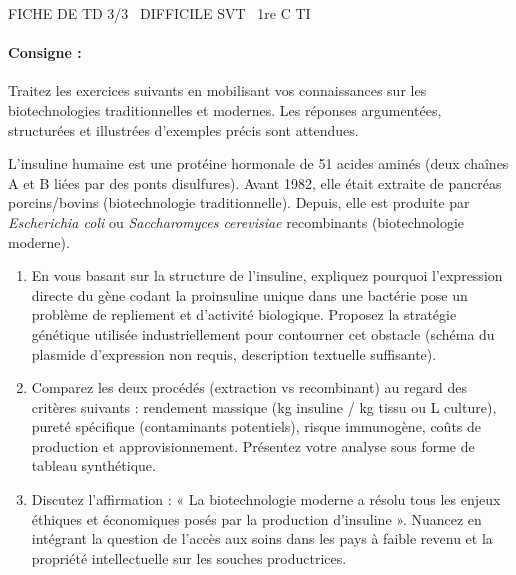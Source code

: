 \documentclass[11pt]{article}
\begin{document}
\begin{tcolorbox}[enhanced,colback=popink,colframe=popink,arc=10pt,boxrule=0pt,left=12pt,right=12pt,top=9pt,bottom=9pt]
{\color{white}\popxbold\small FICHE DE TD 3/3 \textbullet\ DIFFICILE \hfill SVT \textbullet\ 1re C TI\par}
\end{tcolorbox}
\vspace{4pt}
\paragraph{Consigne :} Traitez les exercices suivants en mobilisant vos connaissances sur les biotechnologies traditionnelles et modernes. Les réponses argumentées, structurées et illustrées d'exemples précis sont attendues.

\begin{exercice}
L'insuline humaine est une protéine hormonale de 51 acides aminés (deux chaînes A et B liées par des ponts disulfures). Avant 1982, elle était extraite de pancréas porcins/bovins (biotechnologie traditionnelle). Depuis, elle est produite par \textit{Escherichia coli} ou \textit{Saccharomyces cerevisiae} recombinants (biotechnologie moderne).
\begin{enumerate}
    \item En vous basant sur la structure de l'insuline, expliquez pourquoi l'expression directe du gène codant la proinsuline unique dans une bactérie pose un problème de repliement et d'activité biologique. Proposez la stratégie génétique utilisée industriellement pour contourner cet obstacle (schéma du plasmide d'expression non requis, description textuelle suffisante).
    \item Comparez les deux procédés (extraction vs recombinant) au regard des critères suivants : rendement massique (kg insuline / kg tissu ou L culture), pureté spécifique (contaminants potentiels), risque immunogène, coûts de production et approvisionnement. Présentez votre analyse sous forme de tableau synthétique.
    \item Discutez l'affirmation : « La biotechnologie moderne a résolu tous les enjeux éthiques et économiques posés par la production d'insuline ». Nuancez en intégrant la question de l'accès aux soins dans les pays à faible revenu et la propriété intellectuelle sur les souches productrices.
\end{enumerate}
\end{exercice}
\end{document}
